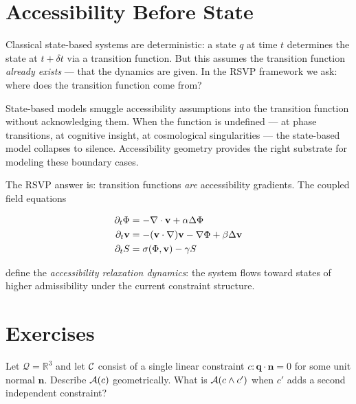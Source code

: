 \section{Accessibility Before State}

Classical state-based systems are deterministic: a state $q$ at time $t$
determines the state at $t + \delta t$ via a transition function. But this
assumes the transition function \emph{already exists} — that the dynamics are
given. In the RSVP framework we ask: where does the transition function come
from?

\begin{warning}
  State-based models smuggle accessibility assumptions into the transition
  function without acknowledging them. When the function is undefined — at
  phase transitions, at cognitive insight, at cosmological singularities —
  the state-based model collapses to silence. Accessibility geometry provides
  the right substrate for modeling these boundary cases.
\end{warning}

The RSVP answer is: transition functions \emph{are} accessibility gradients.
The coupled field equations

\begin{align}
  \partial_t \Phi &= -\nabla \cdot \mathbf{v} + \alpha \Delta \Phi
    \label{eq:phi-dynamics}\\
  \partial_t \mathbf{v} &= -(\mathbf{v} \cdot \nabla)\mathbf{v} - \nabla \Phi
    + \beta \Delta \mathbf{v}
    \label{eq:v-dynamics}\\
  \partial_t S &= \sigma(\Phi, \mathbf{v}) - \gamma S
    \label{eq:s-dynamics}
\end{align}

define the \emph{accessibility relaxation dynamics}: the system flows toward
states of higher admissibility under the current constraint structure.

\section*{Exercises}

\begin{exercise}
  Let $\mathcal{Q} = \mathbb{R}^3$ and let $\mathcal{C}$ consist of a single
  linear constraint $c : \mathbf{q} \cdot \mathbf{n} = 0$ for some unit normal
  $\mathbf{n}$. Describe $\mathcal{A}(c)$ geometrically. What is $\mathcal{A}(c \wedge c')$
  when $c'$ adds a second independent constraint?
\end{exercise}

